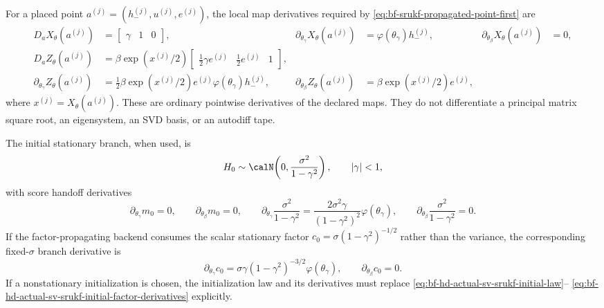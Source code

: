 For a placed point \(a^{(j)}=(h_-^{(j)},u^{(j)},e^{(j)})\), the local map
derivatives required by
\eqref{eq:bf-srukf-propagated-point-first} are
\begin{align}
  D_a X_\theta(a^{(j)})
    &=
    \begin{bmatrix}\gamma&1&0\end{bmatrix},
    &
  \partial_{\theta_\gamma}X_\theta(a^{(j)})
    &=
    \varphi(\theta_\gamma)h_-^{(j)},
    &
  \partial_{\theta_\beta}X_\theta(a^{(j)})
    &=0,
    \label{eq:bf-hd-actual-sv-srukf-transition-derivatives}\\
  D_a Z_\theta(a^{(j)})
    &=
    \beta\exp(x^{(j)}/2)
    \begin{bmatrix}
      \frac12\gamma e^{(j)}&
      \frac12 e^{(j)}&
      1
    \end{bmatrix},
    \label{eq:bf-hd-actual-sv-srukf-observation-state-derivative}\\
  \partial_{\theta_\gamma}Z_\theta(a^{(j)})
    &=
    \frac12
    \beta\exp(x^{(j)}/2)e^{(j)}
    \varphi(\theta_\gamma)h_-^{(j)},
    &
  \partial_{\theta_\beta}Z_\theta(a^{(j)})
    &=
    \beta\exp(x^{(j)}/2)e^{(j)},
    \label{eq:bf-hd-actual-sv-srukf-observation-parameter-derivatives}
\end{align}
where \(x^{(j)}=X_\theta(a^{(j)})\).  These are ordinary pointwise derivatives
of the declared maps.  They do not differentiate a principal matrix square
root, an eigensystem, an SVD basis, or an autodiff tape.

The initial stationary branch, when used, is
\begin{equation}
  H_0\sim\calN\!\left(0,\frac{\sigma^2}{1-\gamma^2}\right),
  \qquad |\gamma|<1,
  \label{eq:bf-hd-actual-sv-srukf-initial-law}
\end{equation}
with score handoff derivatives
\begin{equation}
  \partial_{\theta_\gamma}m_0=0,\qquad
  \partial_{\theta_\beta}m_0=0,\qquad
  \partial_{\theta_\gamma}
  \frac{\sigma^2}{1-\gamma^2}
  =
  \frac{2\sigma^2\gamma}{(1-\gamma^2)^2}\varphi(\theta_\gamma),
  \qquad
  \partial_{\theta_\beta}
  \frac{\sigma^2}{1-\gamma^2}=0.
  \label{eq:bf-hd-actual-sv-srukf-initial-derivatives}
\end{equation}
If the factor-propagating backend consumes the scalar stationary factor
\(c_0=\sigma(1-\gamma^2)^{-1/2}\) rather than the variance, the corresponding
fixed-\(\sigma\) branch derivative is
\begin{equation}
  \partial_{\theta_\gamma}c_0
  =
  \sigma\gamma(1-\gamma^2)^{-3/2}\varphi(\theta_\gamma),
  \qquad
  \partial_{\theta_\beta}c_0=0.
  \label{eq:bf-hd-actual-sv-srukf-initial-factor-derivatives}
\end{equation}
If a nonstationary initialization is chosen, the initialization law and its
derivatives must replace \eqref{eq:bf-hd-actual-sv-srukf-initial-law}--
\eqref{eq:bf-hd-actual-sv-srukf-initial-factor-derivatives} explicitly.

